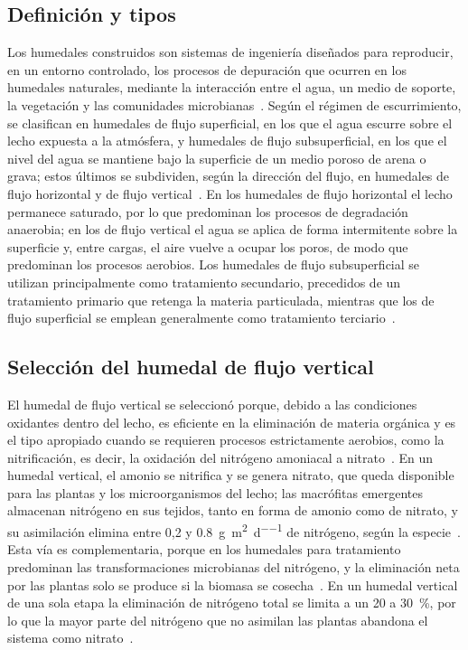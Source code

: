 \subsection{Definición y tipos}

Los humedales construidos son sistemas de ingeniería diseñados para reproducir, en un entorno controlado, los procesos de depuración que ocurren en los humedales naturales, mediante la interacción entre el agua, un medio de soporte, la vegetación y las comunidades microbianas~\parencite{dotro2021humedales,kadlec2008treatment}.
Según el régimen de escurrimiento, se clasifican en humedales de flujo superficial, en los que el agua escurre sobre el lecho expuesta a la atmósfera, y humedales de flujo subsuperficial, en los que el nivel del agua se mantiene bajo la superficie de un medio poroso de arena o grava; estos últimos se subdividen, según la dirección del flujo, en humedales de flujo horizontal y de flujo vertical~\parencite{dotro2021humedales}.
En los humedales de flujo horizontal el lecho permanece saturado, por lo que predominan los procesos de degradación anaerobia; en los de flujo vertical el agua se aplica de forma intermitente sobre la superficie y, entre cargas, el aire vuelve a ocupar los poros, de modo que predominan los procesos aerobios.
Los humedales de flujo subsuperficial se utilizan principalmente como tratamiento secundario, precedidos de un tratamiento primario que retenga la materia particulada, mientras que los de flujo superficial se emplean generalmente como tratamiento terciario~\parencite{dotro2021humedales}.

\subsection{Selección del humedal de flujo vertical}

El humedal de flujo vertical se seleccionó porque, debido a las condiciones oxidantes dentro del lecho, es eficiente en la eliminación de materia orgánica y es el tipo apropiado cuando se requieren procesos estrictamente aerobios, como la nitrificación, es decir, la oxidación del nitrógeno amoniacal a nitrato~\parencite{dotro2021humedales}.
En un humedal vertical, el amonio se nitrifica y se genera nitrato, que queda disponible para las plantas y los microorganismos del lecho; las macrófitas emergentes almacenan nitrógeno en sus tejidos, tanto en forma de amonio como de nitrato, y su asimilación elimina entre 0,2 y \qty{0.8}{\gram\per\square\meter\per\day} de nitrógeno, según la especie~\parencite{dotro2021humedales}.
Esta vía es complementaria, porque en los humedales para tratamiento predominan las transformaciones microbianas del nitrógeno, y la eliminación neta por las plantas solo se produce si la biomasa se cosecha~\parencite{dotro2021humedales}.
En un humedal vertical de una sola etapa la eliminación de nitrógeno total se limita a un 20 a \qty{30}{\percent}, por lo que la mayor parte del nitrógeno que no asimilan las plantas abandona el sistema como nitrato~\parencite{dotro2021humedales}.

